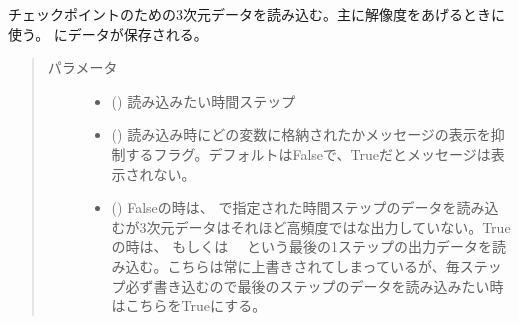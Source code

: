 \documentclass[letterpaper,10pt,dvipdfmx,report]{sphinxmanual}
\begin{document}
\begin{fulllineitems}
\label{\detokenize{io:R2D2.R2D2_data.read_qq_check}}
チェックポイントのための3次元データを読み込む。主に解像度をあげるときに使う。 {\hyperref[\detokenize{io:R2D2.R2D2_data.qc}]{}} にデータが保存される。
\begin{quote}\begin{description}
\item[{パラメータ}] \leavevmode\begin{itemize}
\item {} 
 () \sphinxhyphen{}\sphinxhyphen{} 読み込みたい時間ステップ

\item {} 
 () \sphinxhyphen{}\sphinxhyphen{} 読み込み時にどの変数に格納されたかメッセージの表示を抑制するフラグ。デフォルトはFalseで、Trueだとメッセージは表示されない。

\item {} 
 () \sphinxhyphen{}\sphinxhyphen{} Falseの時は、  で指定された時間ステップのデータを読み込むが3次元データはそれほど高頻度ではな出力していない。Trueの時は、  もしくは　 という最後の1ステップの出力データを読み込む。こちらは常に上書きされてしまっているが、毎ステップ必ず書き込むので最後のステップのデータを読み込みたい時はこちらをTrueにする。

\end{itemize}

\end{description}\end{quote}

\end{fulllineitems}

\end{document}
